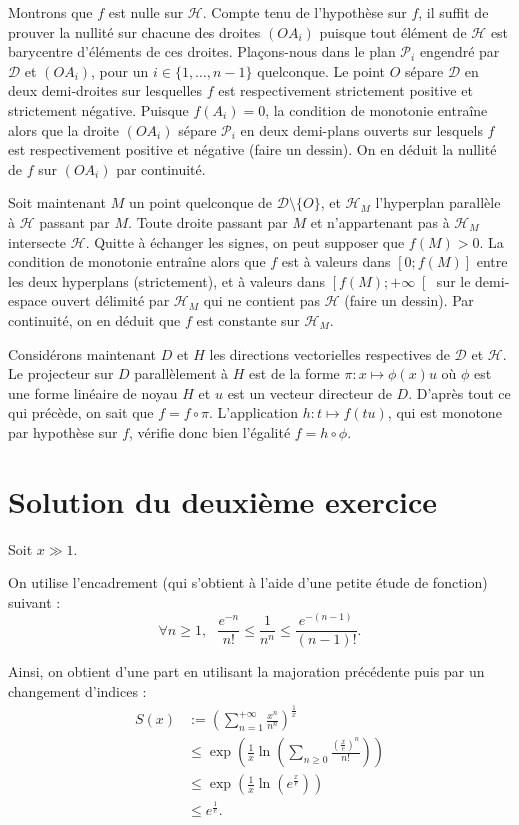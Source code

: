 Montrons que $f$ est nulle sur $\mathcal H$. Compte tenu de l'hypothèse sur $f$, il suffit de prouver la nullité sur chacune des droites $(OA_i)$ puisque tout élément de $\mathcal H$ est barycentre d'éléments de ces droites.
Plaçons-nous dans le plan $\mathcal P_i$ engendré par $\mathcal D$ et $(OA_i)$, pour un $i \in \{1,\dots,n-1\}$ quelconque.
Le point $O$ sépare $\mathcal D$ en deux demi-droites sur lesquelles $f$ est respectivement strictement positive et strictement négative.
Puisque $f(A_i) = 0$, la condition de monotonie entraîne alors que la droite $(OA_i)$ sépare $\mathcal P_i$ en deux demi-plans ouverts sur lesquels $f$ est respectivement positive et négative (faire un dessin).
On en déduit la nullité de $f$ sur $(OA_i)$ par continuité.

Soit maintenant $M$ un point quelconque de $\mathcal D\setminus \{O\}$, et $\mathcal H_M$ l'hyperplan parallèle à $\mathcal H$ passant par $M$.
Toute droite passant par $M$ et n'appartenant pas à $\mathcal H_M$ intersecte $\mathcal H$.
Quitte à échanger les signes, on peut supposer que $f(M) > 0$.
La condition de monotonie entraîne alors que $f$ est à valeurs dans $[0;f(M)]$ entre les deux hyperplans (strictement), et à valeurs dans $\left[f(M);+\infty\right[$ sur le demi-espace ouvert délimité par $\mathcal H_M$ qui ne contient pas $\mathcal H$ (faire un dessin). Par continuité, on en déduit que $f$ est constante sur $\mathcal H_M$.

Considérons maintenant $D$ et $H$ les directions vectorielles respectives de $\mathcal D$ et $\mathcal H$.
Le projecteur sur $D$ parallèlement à $H$ est de la forme $\pi : x \mapsto \phi(x)u$ où $\phi$ est une forme linéaire de noyau $H$ et $u$ est un vecteur directeur de $D$.
D'après tout ce qui précède, on sait que $f = f \circ \pi$.
L'application $h : t \mapsto f(tu)$, qui est monotone par hypothèse sur $f$, vérifie donc bien l'égalité $f = h \circ \phi$.

\section{Solution du deuxième exercice}

Soit $x\gg 1.$

On utilise l'encadrement (qui s'obtient à l'aide d'une petite étude de fonction) suivant :
$$\forall n\geq 1, \mbox{ } \frac{e^{-n}}{n!}\leq \frac{1}{n^{n}}\leq \frac{e^{-(n-1)}}{(n-1)!}.$$

Ainsi, on obtient d'une part en utilisant la majoration précédente puis par un changement d'indices : 
\begin{align*}
S(x) & := \left(\sum_{n=1}^{+\infty}\frac{x^{n}}{n^{n}}\right)^{\frac{1}{x}}\\
& \leq \exp\left( \frac{1}{x}\ln\left( \sum_{n\geq 0}\frac{(\frac{x}{e})^{n}}{n!}\right)\right)\\
& \leq \exp\left( \frac{1}{x}\ln(e^{\frac{x}{e}})\right)\\
& \leq e^{\frac{1}{e}}.
\end{align*}

